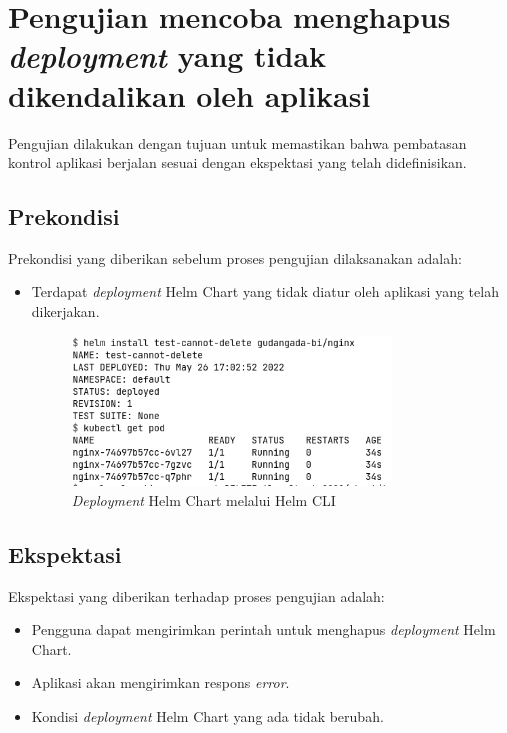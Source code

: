 \section{Pengujian mencoba menghapus \textit{deployment} yang tidak dikendalikan oleh aplikasi}
Pengujian dilakukan dengan tujuan untuk memastikan bahwa pembatasan kontrol aplikasi berjalan sesuai dengan ekspektasi yang telah didefinisikan.
\subsection{Prekondisi}
Prekondisi yang diberikan sebelum proses pengujian dilaksanakan adalah:
\begin{itemize}
    \item Terdapat \textit{deployment} Helm Chart yang tidak diatur oleh aplikasi yang telah dikerjakan.
    \begin{figure}
    	\centering
    	\includegraphics[width=0.8\textwidth]{pics/5.9.chartDeploymentAndGetPod.png}
    	\caption{\textit{Deployment} Helm Chart melalui Helm CLI}
    	\label{fig:helmChartUsingCLI}
    \end{figure}
\end{itemize}
\subsection{Ekspektasi}
Ekspektasi yang diberikan terhadap proses pengujian adalah:
\begin{itemize}
    \item Pengguna dapat mengirimkan perintah untuk menghapus \textit{deployment} Helm Chart.
    \item Aplikasi akan mengirimkan respons \textit{error}.
    \item Kondisi \textit{deployment} Helm Chart yang ada tidak berubah.
\end{itemize}
